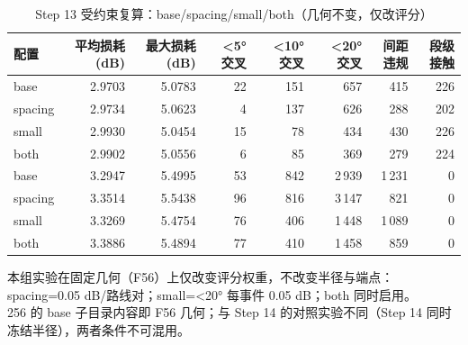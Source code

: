 \begin{table}[htbp]
  \centering
  \caption{Step 13 受约束复算：base/spacing/small/both（几何不变，仅改评分）}
  \label{tab:step13-constrained}
  \begin{tabular}{lrrrrrrr}
    \toprule
    配置 & 平均损耗 (dB) & 最大损耗 (dB) & <5° 交叉 & <10° 交叉 & <20° 交叉 & 间距违规 & 段级接触 \\
    \midrule
    base & 2.9703 & 5.0783 & 22 & 151 & 657 & 415 & 226 \\
    spacing & 2.9734 & 5.0623 & 4 & 137 & 626 & 288 & 202 \\
    small & 2.9930 & 5.0454 & 15 & 78 & 434 & 430 & 226 \\
    both & 2.9902 & 5.0556 & 6 & 85 & 369 & 279 & 224 \\
    \midrule
    base & 3.2947 & 5.4995 & 53 & 842 & 2\,939 & 1\,231 & 0 \\
    spacing & 3.3514 & 5.5438 & 96 & 816 & 3\,147 & 821 & 0 \\
    small & 3.3269 & 5.4754 & 76 & 406 & 1\,448 & 1\,089 & 0 \\
    both & 3.3886 & 5.4894 & 77 & 410 & 1\,458 & 859 & 0 \\
    \bottomrule
  \end{tabular}
  \par\vspace{2pt}
  \begin{flushleft}\footnotesize
  本组实验在固定几何（F56）上仅改变评分权重，不改变半径与端点：spacing=0.05 dB/路线对；small=<20° 每事件 0.05 dB；both 同时启用。 \\
  256 的 base 子目录内容即 F56 几何；与 Step 14 的对照实验不同（Step 14 同时冻结半径），两者条件不可混用。 \\
  \end{flushleft}
\end{table}
